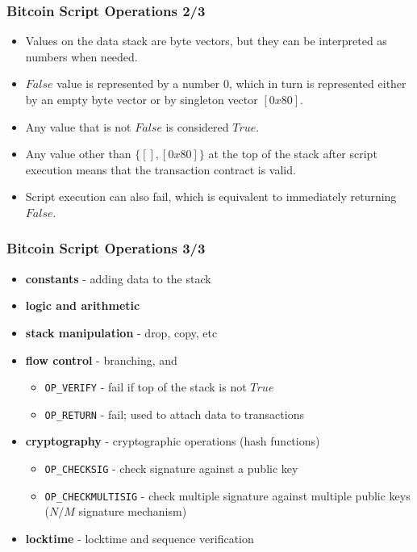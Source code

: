 \documentclass{beamer}
\begin{document}
\begin{frame}[fragile]
  \frametitle{Bitcoin Script Operations 2/3}
  \begin{itemize}
  \item Values on the data stack are byte vectors, but they can be interpreted
    as numbers when needed.
  \item $False$ value is represented by a number 0, which in turn is represented
    either by an empty byte vector or by singleton vector $[0x80]$.
  \item Any value that is not $False$ is considered $True$.
  \item Any value other than $\{[], [0x80]\}$ at the top of the stack after script
    execution means that the transaction contract is valid.
  \item Script execution can also fail, which is equivalent to immediately
    returning $False$.
  \end{itemize}
\end{frame}

\begin{frame}[fragile]
  \frametitle{Bitcoin Script Operations 3/3}
  \begin{itemize}
  \item \textbf{constants} - adding data to the stack
  \item \textbf{logic and arithmetic}
  \item \textbf{stack manipulation} - drop, copy, etc
  \item \textbf{flow control} - branching, and
    \begin{itemize}
    \item \texttt{OP_VERIFY} - fail if top of the stack is not
      $True$
    \item \texttt{OP_RETURN} - fail; used to attach data to
      transactions
    \end{itemize}
  \item \textbf{cryptography} - cryptographic operations (hash functions)
    \begin{itemize}
    \item \texttt{OP_CHECKSIG} - check signature against a public
      key
    \item \texttt{OP_CHECKMULTISIG} - check multiple signature
      against multiple public keys ($N/M$ signature mechanism)
    \end{itemize}
  \item \textbf{locktime} - locktime and sequence verification
  \end{itemize}
\end{frame}
\end{document}
